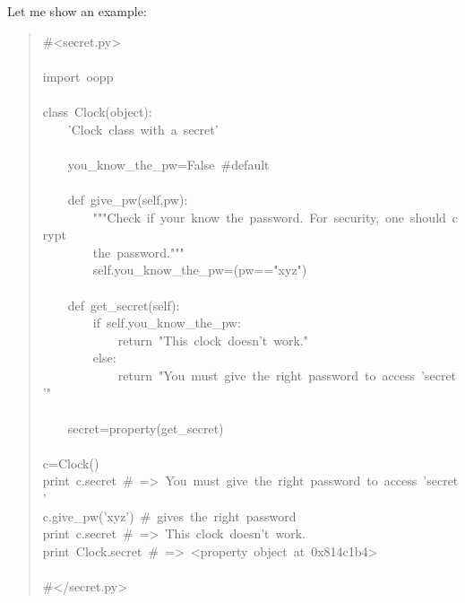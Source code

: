 \documentclass[10pt,english]{article}
\begin{document}
Let me show an example:
\begin{quote}
\begin{ttfamily}\begin{flushleft}
\mbox{{\#}<secret.py>}\\
\mbox{}\\
\mbox{import~oopp}\\
\mbox{}\\
\mbox{class~Clock(object):~}\\
\mbox{~~~~'Clock~class~with~a~secret'}\\
\mbox{~~}\\
\mbox{~~~~you{\_}know{\_}the{\_}pw=False~{\#}default}\\
\mbox{~~~~~~~~~~~~~~~~~}\\
\mbox{~~~~def~give{\_}pw(self,pw):}\\
\mbox{~~~~~~~~"""Check~if~your~know~the~password.~For~security,~one~should~crypt}\\
\mbox{~~~~~~~~the~password."""}\\
\mbox{~~~~~~~~self.you{\_}know{\_}the{\_}pw=(pw=="xyz")}\\
\mbox{~~~~~~}\\
\mbox{~~~~def~get{\_}secret(self):}\\
\mbox{~~~~~~~~if~self.you{\_}know{\_}the{\_}pw:}\\
\mbox{~~~~~~~~~~~~return~"This~clock~doesn't~work."}\\
\mbox{~~~~~~~~else:}\\
\mbox{~~~~~~~~~~~~return~"You~must~give~the~right~password~to~access~'secret'"}\\
\mbox{~~~~~~}\\
\mbox{~~~~secret=property(get{\_}secret)}\\
\mbox{}\\
\mbox{c=Clock()}\\
\mbox{print~c.secret~{\#}~=>~You~must~give~the~right~password~to~access~'secret'}\\
\mbox{c.give{\_}pw('xyz')~{\#}~gives~the~right~password}\\
\mbox{print~c.secret~{\#}~=>~This~clock~doesn't~work.}\\
\mbox{print~Clock.secret~{\#}~=>~<property~object~at~0x814c1b4>}\\
\mbox{}\\
\mbox{{\#}</secret.py>}
\end{flushleft}\end{ttfamily}
\end{quote}
\end{document}
